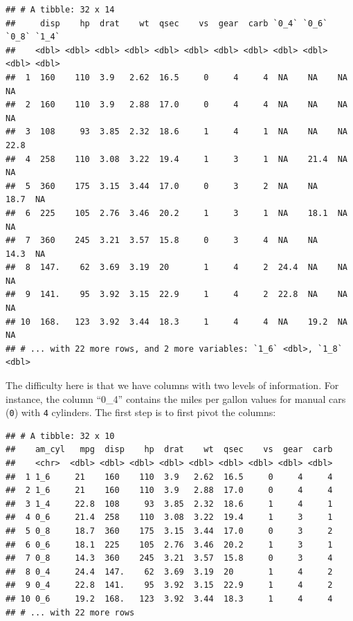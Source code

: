 \documentclass[]{gitbook}
\newenvironment{Shaded}{\begin{snugshade}}{\end{snugshade}}
\newcommand{\DataTypeTok}[1]{\textcolor[rgb]{0.13,0.29,0.53}{#1}}
\newcommand{\KeywordTok}[1]{\textcolor[rgb]{0.13,0.29,0.53}{\textbf{#1}}}
\newcommand{\NormalTok}[1]{#1}
\newcommand{\OperatorTok}[1]{\textcolor[rgb]{0.81,0.36,0.00}{\textbf{#1}}}
\newcommand{\OtherTok}[1]{\textcolor[rgb]{0.56,0.35,0.01}{#1}}
\newcommand{\StringTok}[1]{\textcolor[rgb]{0.31,0.60,0.02}{#1}}
\begin{document}
\begin{verbatim}
## # A tibble: 32 x 14
##     disp    hp  drat    wt  qsec    vs  gear  carb `0_4` `0_6` `0_8` `1_4`
##    <dbl> <dbl> <dbl> <dbl> <dbl> <dbl> <dbl> <dbl> <dbl> <dbl> <dbl> <dbl>
##  1  160    110  3.9   2.62  16.5     0     4     4  NA    NA    NA    NA  
##  2  160    110  3.9   2.88  17.0     0     4     4  NA    NA    NA    NA  
##  3  108     93  3.85  2.32  18.6     1     4     1  NA    NA    NA    22.8
##  4  258    110  3.08  3.22  19.4     1     3     1  NA    21.4  NA    NA  
##  5  360    175  3.15  3.44  17.0     0     3     2  NA    NA    18.7  NA  
##  6  225    105  2.76  3.46  20.2     1     3     1  NA    18.1  NA    NA  
##  7  360    245  3.21  3.57  15.8     0     3     4  NA    NA    14.3  NA  
##  8  147.    62  3.69  3.19  20       1     4     2  24.4  NA    NA    NA  
##  9  141.    95  3.92  3.15  22.9     1     4     2  22.8  NA    NA    NA  
## 10  168.   123  3.92  3.44  18.3     1     4     4  NA    19.2  NA    NA  
## # ... with 22 more rows, and 2 more variables: `1_6` <dbl>, `1_8` <dbl>
\end{verbatim}

The difficulty here is that we have columns with two levels of information. For instance, the
column ``0\_4'' contains the miles per gallon values for manual cars (\texttt{0}) with \texttt{4} cylinders.
The first step is to first pivot the columns:

\begin{Shaded}
\end{Shaded}

\begin{verbatim}
## # A tibble: 32 x 10
##    am_cyl   mpg  disp    hp  drat    wt  qsec    vs  gear  carb
##    <chr>  <dbl> <dbl> <dbl> <dbl> <dbl> <dbl> <dbl> <dbl> <dbl>
##  1 1_6     21    160    110  3.9   2.62  16.5     0     4     4
##  2 1_6     21    160    110  3.9   2.88  17.0     0     4     4
##  3 1_4     22.8  108     93  3.85  2.32  18.6     1     4     1
##  4 0_6     21.4  258    110  3.08  3.22  19.4     1     3     1
##  5 0_8     18.7  360    175  3.15  3.44  17.0     0     3     2
##  6 0_6     18.1  225    105  2.76  3.46  20.2     1     3     1
##  7 0_8     14.3  360    245  3.21  3.57  15.8     0     3     4
##  8 0_4     24.4  147.    62  3.69  3.19  20       1     4     2
##  9 0_4     22.8  141.    95  3.92  3.15  22.9     1     4     2
## 10 0_6     19.2  168.   123  3.92  3.44  18.3     1     4     4
## # ... with 22 more rows
\end{verbatim}
\end{document}

